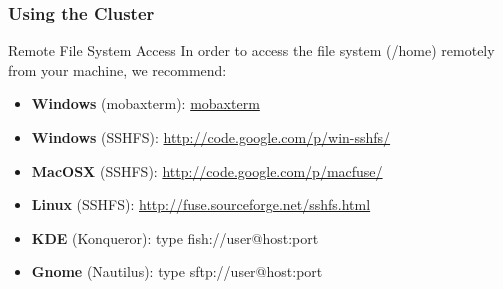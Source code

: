\documentclass{beamer}
\begin{document}
\begin{frame}[fragile]
  \frametitle{Using the Cluster}
      \begin{block}{Remote File System Access}
       In order to access the file system (/home) remotely from your machine, we recommend:
        \begin{itemize}
        \item \textbf{Windows} (mobaxterm): \href{http://mobaxterm.mobatek.net/}{mobaxterm}
        \item \textbf{Windows} (SSHFS): \url{http://code.google.com/p/win-sshfs/}
        \item \textbf{MacOSX} (SSHFS): \url{http://code.google.com/p/macfuse/}
        \item \textbf{Linux} (SSHFS): \url{http://fuse.sourceforge.net/sshfs.html}
        \item \textbf{KDE} (Konqueror): type fish://user@host:port
        \item \textbf{Gnome} (Nautilus): type sftp://user@host:port
      \end{itemize}
      \end{block}
\end{frame}

\end{document}
